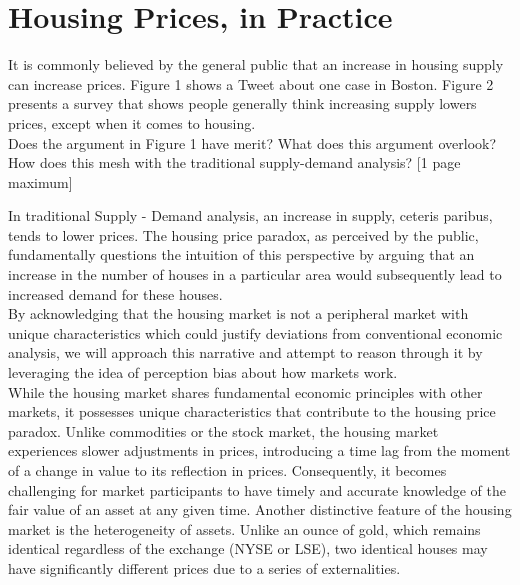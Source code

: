 \section{Housing Prices, in Practice}

\begin{tcolorbox}
    It is commonly believed by the general public that an increase in housing supply can increase prices.
    Figure 1 shows a Tweet about one case in Boston. Figure 2 presents a survey that shows people
    generally think increasing supply lowers prices, except when it comes to housing.\\

    Does the argument in Figure 1 have merit? What does this argument overlook? How does this
    mesh with the traditional supply-demand analysis? [1 page maximum]
\end{tcolorbox}

In traditional Supply - Demand analysis, an increase in supply, ceteris paribus, tends to lower prices. The housing price paradox, as perceived by the public, fundamentally questions the intuition of this perspective by arguing that an increase in the number of houses in a particular area would subsequently lead to increased demand for these houses. \\

By acknowledging that the housing market is not a peripheral market with unique characteristics which could justify deviations from conventional economic analysis, we will approach this narrative and attempt to reason through it by leveraging the idea of perception bias about how markets work. \\

While the housing market shares fundamental economic principles with other markets, it possesses unique characteristics that contribute to the housing price paradox. Unlike commodities or the stock market, the housing market experiences slower adjustments in prices, introducing a time lag from the moment of a change in value to its reflection in prices. Consequently, it becomes challenging for market participants to have timely and accurate knowledge of the fair value of an asset at any given time. Another distinctive feature of the housing market is the heterogeneity of assets. Unlike an ounce of gold, which remains identical regardless of the exchange (NYSE or LSE), two identical houses may have significantly different prices due to a series of externalities.\\

